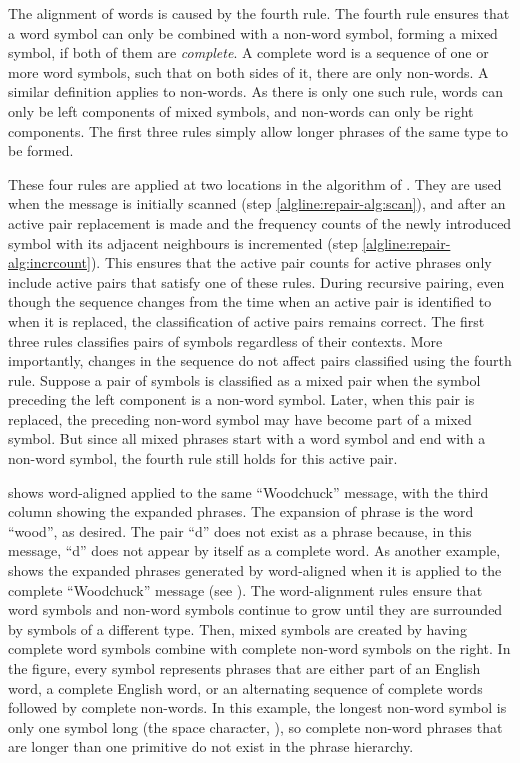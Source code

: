 The alignment of words is caused by the fourth rule.
The fourth rule ensures that a word symbol can only be
combined with a non-word symbol, forming a mixed symbol,
if both of them are 
{\emph {complete}}.  A complete word is a sequence of one
or more word symbols, such that on both sides of it, 
there are only non-words.  A similar definition applies to 
non-words.  As there is only one such rule, words can only
be left components of mixed symbols, and non-words can only
be right components.  The first three rules simply allow 
longer phrases of the same type to be formed.

These four rules are applied at two locations
in the \repair algorithm of .  They
are used when the message is initially scanned 
(step \ref{algline:repair-alg:scan}), and after an active 
pair replacement is made and the frequency counts of the
newly introduced symbol with its adjacent neighbours is incremented 
(step \ref{algline:repair-alg:incrcount}).  This
ensures that the active pair counts for active phrases only include
active pairs that satisfy one of these rules.  During recursive
pairing, even though the sequence changes from the time
when an active pair is identified to when 
it is replaced, the classification of active pairs remains
correct.  The first three rules classifies pairs of symbols
regardless of their contexts.  More importantly, changes in the 
sequence do not affect pairs classified using the fourth rule.  
Suppose a pair of symbols is classified as
a mixed pair when the symbol preceding the left component
is a non-word symbol.  Later, when this pair is replaced,
the preceding non-word symbol may have become part of a mixed
symbol.  But since all mixed phrases start with a word
symbol and end with a non-word symbol, the fourth rule still 
holds for this active pair.

 shows word-aligned \repair applied
to the same ``Woodchuck'' message, with the third column showing
the expanded phrases.  The expansion of phrase  is 
the word ``wood'', as desired.  The pair ``d{\tvs}'' does not
exist as a phrase because, in this message, ``d'' does not appear
by itself as a complete word.  As another example, 
 shows the expanded phrases
generated by word-aligned \repair when it is applied to the
complete ``Woodchuck'' message (see ).
The word-alignment rules ensure that word symbols and non-word
symbols continue to grow until they are surrounded by symbols of
a different type.  Then, mixed symbols are created by having
complete word symbols combine with complete non-word symbols on
the right.  In the figure, every symbol represents phrases
that are either part of an English word, a complete English
word, or an alternating sequence of complete words followed by 
complete non-words.  In this example, the longest non-word symbol 
is only one symbol long (the space character, {\tvs}), 
so complete non-word phrases that are longer than one primitive 
do not exist in the phrase hierarchy.

